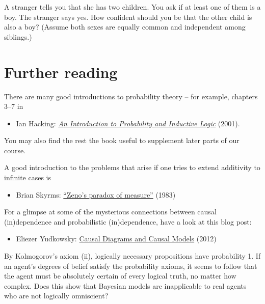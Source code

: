 
\begin{exercise}
  A stranger tells you that she has two children. You ask if at least
  one of them is a boy. The stranger says yes. How confident should
  you be that the other child is also a boy? (Assume both sexes are
  equally common and independent among siblings.)
\end{exercise}


\section{Further reading}

There are many good introductions to probability theory -- for
example, chapters 3--7 in
%
\begin{itemize}
\item Ian Hacking: \href{http://fitelson.org/confirmation/hacking_introduction_to_probability_and_inductive_logic.pdf}{\emph{An Introduction to Probability and Inductive Logic}} (2001).
\end{itemize}
%
You may also find the rest the book useful to supplement later parts
of our course.

A good introduction to the problems that arise if one tries to extend
additivity to infinite cases is
%
\begin{itemize}
\item Brian Skyrms: \href{http://joelvelasco.net/teaching/3865/skyrms\%2083\%20-\%20zeno\%27s\%20paradox\%20of\%20measure.pdf}{``Zeno's paradox of measure''} (1983)
\end{itemize}

For a glimpse at some of the mysterious connections between causal
(in)dependence and probabilistic (in)dependence, have a look at this
blog post:
%
\begin{itemize}
\item Eliezer Yudkowsky: \href{http://lesswrong.com/lw/ev3/causal_diagrams_and_causal_models/}{Causal Diagrams and Causal Models} (2012)
\end{itemize}


\begin{essay}
  By Kolmogorov's axiom (ii), logically necessary propositions have
  probability 1. If an agent's degrees of belief satisfy the
  probability axioms, it seems to follow that the agent must be
  absolutely certain of every logical truth, no matter how
  complex. Does this show that Bayesian models are inapplicable to
  real agents who are not logically omniscient?
\end{essay}

